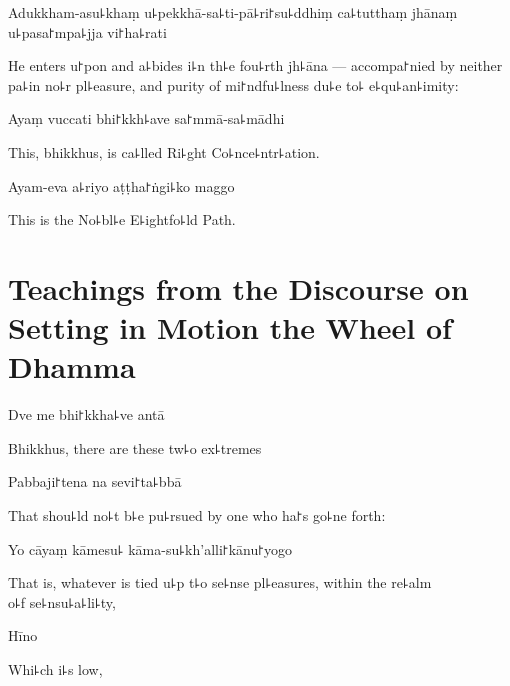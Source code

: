 Adukkham-asu꜕khaṃ u꜕pekkhā-sa꜕ti-pā꜕ri꜓su꜕ddhiṃ ca꜕tutthaṃ jhānaṃ u꜕pasa꜓mpa꜕jja vi꜓ha꜕rati

\begin{english}
  He enters u꜓pon and a꜕bides i꜕n th꜕e fou꜕rth jh꜕āna --- accompa꜓nied
  by neither pa꜕in no꜕r pl꜕easure, and purity of mi꜓ndfu꜕lness du꜕e to꜕
  e꜕qu꜕an꜕imity:
\end{english}

Ayaṃ vuccati bhi꜓kkh꜕ave sa꜓mmā-sa꜕mādhi

\begin{english}
  This, bhikkhus, is ca꜕lled Ri꜕ght Co꜕nce꜕ntr꜕ation.
\end{english}

Ayam-eva a꜕riyo aṭṭha꜓ṅgi꜕ko maggo

\begin{english}
  This is the No꜕bl꜕e E꜕ightfo꜕ld Path.
\end{english}

\chapter[The Wheel of Dhamma]{Teachings from the Discourse on Setting in Motion the Wheel of Dhamma}%


\begin{leader}
\end{leader}

Dve me bhi꜓kkha꜕ve antā

\begin{english}
  Bhikkhus, there are these tw꜕o ex꜕tremes
\end{english}

Pabbaji꜓tena na sevi꜓ta꜕bbā

\begin{english}
  That shou꜕ld no꜕t b꜕e pu꜕rsued by one who ha꜓s go꜕ne forth:
\end{english}

Yo cāyaṃ kāmesu꜕ kāma-su꜕kh'alli꜓kānu꜓yogo

\begin{english}
  That is, whatever is tied u꜕p t꜕o se꜕nse pl꜕easures, within the re꜕alm\\ o꜕f se꜕nsu꜕a꜕li꜕ty,
\end{english}

Hīno

\begin{english}
  Whi꜕ch i꜕s low,
\end{english}

